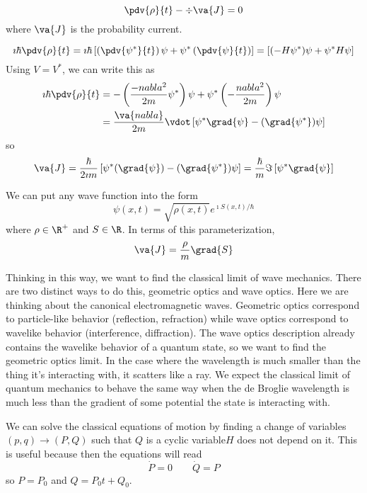 \documentclass[a4paper,twoside,master.tex]{subfiles}
\begin{document}
\begin{equation}
    \pdv{\rho}{t} - \div{\va{J}} = 0
\end{equation}
where $ \va{J} $ is the probability current.

\begin{equation}
    \imath \hbar \pdv{\rho}{t} = \imath \hbar \left[ \left( \pdv{\psi^*}{t} \right) \psi + \psi^* \left( \pdv{\psi}{t} \right) \right] = \left[ (- H \psi^*) \psi + \psi^* H \psi \right]
\end{equation}
Using $ V = V^* $, we can write this as
\begin{align}
    \imath \hbar \pdv{\rho}{t} &= - \left( \frac{- nabla^2}{2m} \psi^* \right) \psi + \psi^* \left( - \frac{nabla^2}{2m} \right) \psi \\
    &= \frac{\va{nabla}}{2m} \vdot \left[ \psi^* \grad{\psi} - (\grad{\psi^*}) \psi \right]
\end{align}
so
\begin{equation}
    \va{J} = \frac{\hbar}{2 \imath m} \left[ \psi^* (\grad{\psi}) - (\grad{\psi^*}) \psi \right] = \frac{\hbar}{m} \Im\left[ \psi^* \grad{\psi} \right] 
\end{equation}

We can put any wave function into the form
\begin{equation}
    \psi(x,t) = \sqrt{\rho(x, t)} e^{\imath S(x,t) / \hbar}
\end{equation}
where $ \rho \in \R^+ $ and $ S \in \R $. In terms of this parameterization,
\begin{equation}
    \va{J} = \frac{\rho}{m} \grad{S}
\end{equation}

Thinking in this way, we want to find the classical limit of wave mechanics. There are two distinct ways to do this, geometric optics and wave optics. Here we are thinking about the canonical electromagnetic waves. Geometric optics correspond to particle-like behavior (reflection, refraction) while wave optics correspond to wavelike behavior (interference, diffraction). The wave optics description already contains the wavelike behavior of a quantum state, so we want to find the geometric optics limit. In the case where the wavelength is much smaller than the thing it's interacting with, it scatters like a ray. We expect the classical limit of quantum mechanics to behave the same way when the de Broglie wavelength is much less than the gradient of some potential the state is interacting with.

We can solve the classical equations of motion by finding a change of variables $ (p,q) \to (P,Q) $ such that $ Q $ is a cyclic variable\textemdash $ H $ does not depend on it. This is useful because then the equations will read
\begin{equation}
    \dot{P} = 0 \qquad \dot{Q} = P
\end{equation}
so $ P = P_0 $ and $ Q = P_0 t + Q_0 $.
\end{document}
